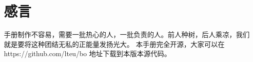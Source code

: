 
% 
%
%
%








\clearpage{\pagestyle{empty}\cleardoublepage}
\chapter*{感言}
\thispagestyle{empty}

手册制作不容易，需要一批热心的人，一批负责的人。前人种树，后人乘凉，我们就是要将这种团结无私的正能量发扬光大。
本手册完全开源，大家可以在 https://github.com/lteu/bo 地址下载到本版本源代码。